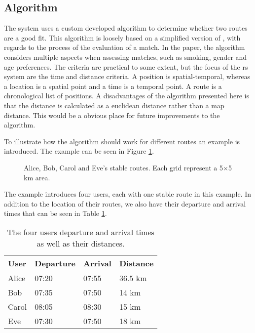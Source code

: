 \subsection{Algorithm}\label{ssec:algorithm}
The system uses a custom developed algorithm to determine whether two routes are a good fit.
This algorithm is loosely based on a simplified version of \citet{ghoseiri2011real}, with regards to the process of the evaluation of a match.
In the paper, the algorithm considers multiple aspects when assessing matches, such as smoking, gender and age preferences.
The criteria are practical to some extent, but the focus of the \gls{rs} system are the time and distance criteria.
A position is spatial-temporal, whereas a location is a spatial point and a time is a temporal point.
A route is a chronological list of positions.
A disadvantages of the algorithm presented here is that the distance is calculated as a euclidean distance rather than a map distance. 
This would be a obvious place for future improvements to the algorithm.

To illustrate how the algorithm should work for different routes an example is introduced. The example can be seen in Figure \ref{fig:algEx1}.
\begin{figure}[!ht]
    \centering

    \caption{Alice, Bob, Carol and Eve's stable routes. Each grid represent a 5$\times$5 km area.}
    \label{fig:algEx1}
\end{figure}
The example introduces four users, each with one stable route in this example. In addition to the location of their routes, we also have their departure and arrival times that can be seen in Table \ref{timetable}.
\begin{table}[]
\centering
\begin{tabular}{@{}llll@{}}
\toprule
\textbf{User} & \textbf{Departure} & \textbf{Arrival} & \textbf{Distance} 	\\ \midrule
Alice         & 07:20                   & 07:55       & 36.5 km 			\\
Bob           & 07:35                   & 07:50       & 14 km  		  		\\
Carol         & 08:05                   & 08:30       & 15 km         		\\
Eve           & 07:30                   & 07:50       & 18 km         		\\ \bottomrule
\end{tabular}
\caption{The four users departure and arrival times as well as their distances.}
\label{timetable}
\end{table}

